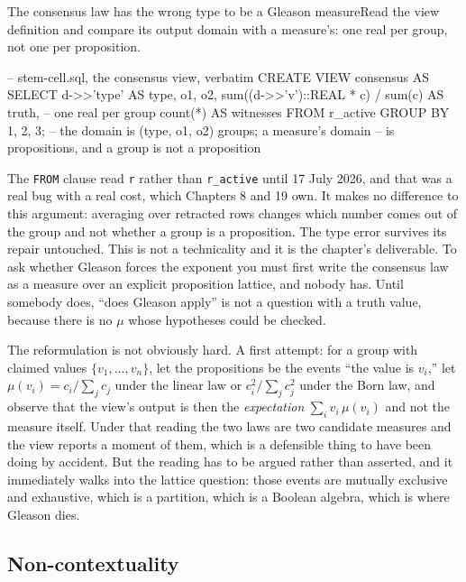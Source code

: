 \begin{Correspondence}{The consensus law has the wrong type to be a Gleason measure}{Read the view definition and compare its output domain with a measure's: one real per group, not one per proposition.}
\begin{Check}
-- stem-cell.sql, the consensus view, verbatim
CREATE VIEW consensus AS
SELECT d->>'type' AS type, o1, o2,
       sum((d->>'v')::REAL * c) / sum(c) AS truth,   -- one real per group
       count(*) AS witnesses
FROM r_active
GROUP BY 1, 2, 3;    -- the domain is (type, o1, o2) groups; a measure's domain
                     -- is propositions, and a group is not a proposition
\end{Check}
The \texttt{FROM} clause read \texttt{r} rather than \texttt{r\_active} until 17 July 2026, and that was a real bug with a real cost, which Chapters 8 and 19 own. It makes no difference to this argument: averaging over retracted rows changes which number comes out of the group and not whether a group is a proposition. The type error survives its repair untouched.
This is not a technicality and it is the chapter's deliverable. To ask whether Gleason forces the exponent you must first write the consensus law as a measure over an explicit proposition lattice, and nobody has. Until somebody does, ``does Gleason apply'' is not a question with a truth value, because there is no $\mu$ whose hypotheses could be checked.

The reformulation is not obviously hard. A first attempt: for a group with claimed values $\{v_1, \dots, v_n\}$, let the propositions be the events ``the value is $v_i$,'' let $\mu(v_i) = c_i / \sum_j c_j$ under the linear law or $c_i^2 / \sum_j c_j^2$ under the Born law, and observe that the view's output is then the \emph{expectation} $\sum_i v_i\, \mu(v_i)$ and not the measure itself. Under that reading the two laws are two candidate measures and the view reports a moment of them, which is a defensible thing to have been doing by accident. But the reading has to be argued rather than asserted, and it immediately walks into the lattice question: those events are mutually exclusive and exhaustive, which is a partition, which is a Boolean algebra, which is where Gleason dies.
\end{Correspondence}

\subsection{Non-contextuality}

